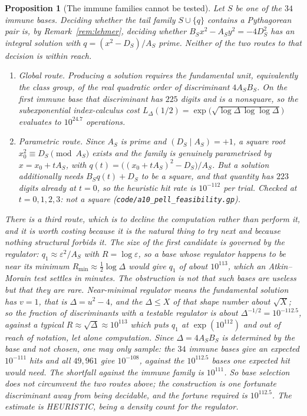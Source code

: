\documentclass[11pt]{article}
\newtheorem{proposition}[theorem]{Proposition}
\theoremstyle{definition}
\begin{document}
\begin{proposition}[The immune families cannot be tested]\label{prop:untestable}
Let $S$ be one of the $34$ immune bases. Deciding whether the tail family $S\cup\{q\}$ contains a
Pythagorean pair is, by Remark~\textup{\ref{rem:lehmer}}, deciding whether
$B_Sx^2-A_Sy^2=-4D_S^2$ has an integral solution with $q=(x^2-D_S)/A_S$ prime. Neither of the two
routes to that decision is within reach.
\begin{enumerate}[label=\textup{(\roman*)},leftmargin=2.2em]
\item \emph{Global route.} Producing a solution requires the fundamental unit, equivalently the
class group, of the real quadratic order of discriminant $4A_SB_S$. On the first immune base that
discriminant has $225$ digits and is a nonsquare, so the subexponential index-calculus cost
$L_\Delta(1/2)=\exp\bigl(\sqrt{\log\Delta\,\log\log\Delta}\bigr)$ evaluates to $10^{24.7}$
operations.
\item \emph{Parametric route.} Since $A_S$ is prime and $(D_S\mid A_S)=+1$, a square root
$x_0^2\equiv D_S\pmod{A_S}$ exists and the family is genuinely parametrised by $x=x_0+tA_S$, with
$q(t)=\bigl((x_0+tA_S)^2-D_S\bigr)/A_S$. But a solution additionally needs $B_Sq(t)+D_S$ to be a
square, and that quantity has $223$ digits already at $t=0$, so the heuristic hit rate is
$10^{-112}$ per trial. Checked at $t=0,1,2,3$: not a square
\textup{(\texttt{code/a10\_pell\_feasibility.gp})}.
\end{enumerate}
There is a third route, which is to decline the computation rather than perform it, and it is worth
costing because it is the natural thing to try next and because nothing structural forbids it. The
size of the first candidate is governed by the regulator: $q_1\approx\varepsilon^2/A_S$ with
$R=\log\varepsilon$, so a base whose regulator happens to be near its minimum
$R_{\min}\approx\tfrac12\log\Delta$ would give $q_1$ of about $10^{113}$, which an Atkin--Morain
test settles in minutes. The obstruction is not that such bases are useless but that they are rare.
Near-minimal regulator means the fundamental solution has $v=1$, that is $\Delta=u^2-4$, and the
$\Delta\le X$ of that shape number about $\sqrt X$; so the fraction of discriminants with a testable
regulator is about $\Delta^{-1/2}=10^{-112.5}$, against a typical $R\approx\sqrt\Delta\approx
10^{113}$ which puts $q_1$ at $\exp(10^{112})$ and out of reach of notation, let alone computation.
Since $\Delta=4A_SB_S$ is determined by the base and not chosen, one may only sample: the $34$
immune bases give an expected $10^{-111}$ hits and all $49{,}961$ give $10^{-108}$, against the
$10^{112.5}$ bases one expected hit would need. The shortfall against the immune family is
$10^{111}$. So base selection does not circumvent the two routes above; the construction is one
fortunate discriminant away from being decidable, and the fortune required is $10^{112.5}$. The
estimate is \textup{HEURISTIC}, being a density count for the regulator.
\end{proposition}
\end{document}
